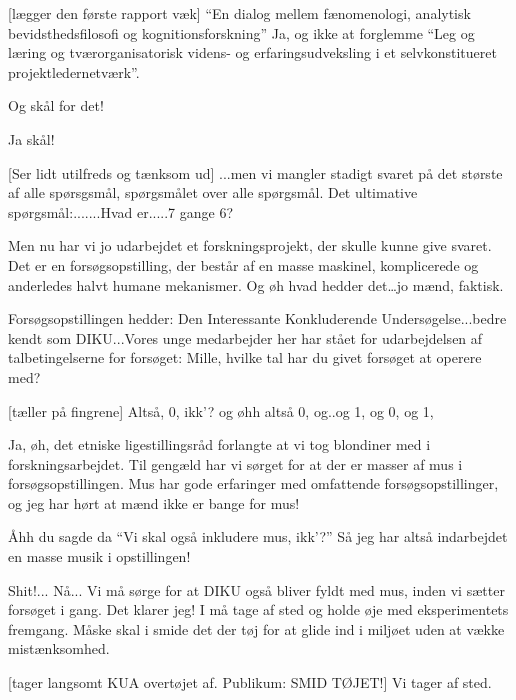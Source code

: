 \documentclass[a4paper,12pt]{article}
\begin{document}
\begin{sketch}
[lægger den første rapport væk] ``En dialog mellem
fænomenologi, analytisk bevidsthedsfilosofi og kognitionsforskning''
 Ja, og ikke at forglemme ``Leg og
læring og tværorganisatorisk videns- og erfaringsudveksling i et
selvkonstitueret projektledernetværk''.

 Og skål for det!

 Ja skål! 

[Ser lidt utilfreds og tænksom ud] ...men vi mangler stadigt
svaret på det største af alle spørsgsmål, spørgsmålet over alle
spørgsmål. Det ultimative spørgsmål:.......Hvad er.....7 gange 6?


 Men nu har vi jo udarbejdet et forskningsprojekt, der
skulle kunne give svaret. Det er en forsøgsopstilling, der består af
en masse maskinel, komplicerede og anderledes halvt humane mekanismer.
Og øh hvad hedder det\ldots jo mænd, faktisk.

 Forsøgsopstillingen hedder: Den Interessante Konkluderende
Undersøgelse...bedre kendt som DIKU...Vores unge medarbejder her har
stået for udarbejdelsen af talbetingelserne for forsøget: Mille,
hvilke tal har du givet forsøget at operere med?

[tæller på fingrene] Altså, 0, ikk'? og øhh altså 0, og..og
1, og 0, og 1,

 Ja, øh, det etniske ligestillingsråd forlangte at vi tog
blondiner med i forskningsarbejdet.  Til gengæld har vi sørget for at
der er masser af mus i forsøgsopstillingen. Mus har gode erfaringer
med omfattende forsøgsopstillinger, og jeg har hørt at mænd ikke er
bange for mus!

 Åhh du sagde da ``Vi skal også inkludere mus, ikk'?'' Så jeg
har altså indarbejdet en masse musik i opstillingen!

 Shit!... Nå... Vi må sørge for at DIKU også bliver fyldt med
mus, inden vi sætter forsøget i gang.  Det klarer jeg!   I må tage af sted og holde øje med eksperimentets fremgang.
Måske skal i smide det der tøj for at glide ind i miljøet uden at
vække mistænksomhed.

[tager langsomt KUA overtøjet af. Publikum: SMID
TØJET!]  Vi tager af sted.


\end{sketch}
\end{document}
